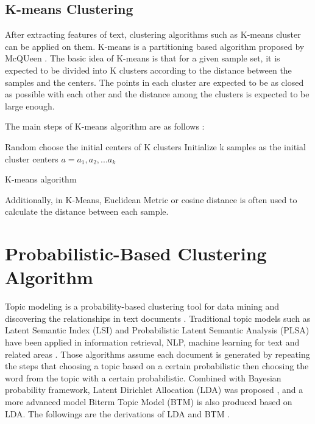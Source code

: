 \subsection{K-means Clustering}
After extracting features of text, clustering algorithms such as K-means cluster can be applied on them. K-means is a partitioning based algorithm proposed by McQUeen \cite{macqueen1967some}. The basic idea of K-means is that for a given sample set, it is expected to be divided into K clusters according to the distance between the samples and the centers. The points in each cluster are expected to be as closed as possible with each other and the distance among the clusters is expected to be large enough.

The main steps of K-means algorithm are as follows \cite{jain2010data}:

\begin{algorithm}[H]
  \SetAlgoLined
  Random choose the initial centers of K clusters\;
  Initialize k samples as the initial cluster centers $a=a_1, a_2,...a_k$\;
  \caption{K-means algorithm}
\end{algorithm}

Additionally, in K-Means, Euclidean Metric or cosine distance is often used to calculate the distance between each sample.



\section{Probabilistic-Based Clustering Algorithm}
Topic modeling is a probability-based clustering tool for data mining and discovering the relationships in text documents \cite{allahyari2017brief, jelodar2019latent}. Traditional topic models such as Latent Semantic Index (LSI) and Probabilistic Latent Semantic Analysis (PLSA) have been applied in information retrieval, NLP, machine learning for text and related areas \cite{hofmann2013probabilistic}. Those algorithms assume each document is generated by repeating the steps that choosing a topic based on a certain probabilistic then choosing the word from the topic with a certain probabilistic. Combined with Bayesian probability framework, Latent Dirichlet Allocation (LDA) was proposed \cite{blei2003latent}, and a more advanced model Biterm Topic Model (BTM) is also produced based on LDA. The followings are the derivations of LDA and BTM \cite{heinrich2005parameter}.

